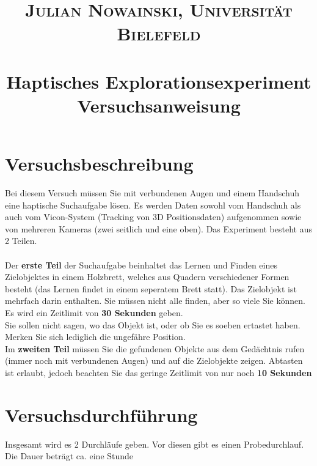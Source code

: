 \documentclass[paper=a4, fontsize=11pt]{scrartcl} %
\title{	
\normalfont \normalsize 
\textsc{Julian Nowainski, Universität Bielefeld} \\ [5pt] %
\horrule{0.5pt} \\[0.4cm] %
\huge Haptisches Explorationsexperiment \\ %
\large Versuchsanweisung
\horrule{2pt} \\[0.5cm] %
\date{\vspace{-10ex}} %
}
\numberwithin{equation}{section} %
\numberwithin{figure}{section} %
\numberwithin{table}{section} %
\begin{document}
\maketitle %


\section{Versuchsbeschreibung}
Bei diesem Versuch müssen Sie mit verbundenen Augen und einem Handschuh eine haptische Suchaufgabe lösen. Es werden Daten sowohl vom Handschuh als auch vom Vicon-System (Tracking von 3D Positionsdaten) aufgenommen sowie von mehreren Kameras (zwei seitlich und eine oben). Das Experiment besteht aus 2 Teilen. \\\\
Der \textbf{erste Teil} der Suchaufgabe beinhaltet das Lernen und Finden eines Zielobjektes in einem Holzbrett, welches aus Quadern verschiedener Formen besteht (das Lernen findet in einem seperatem Brett statt). Das Zielobjekt ist mehrfach darin enthalten. Sie müssen nicht alle finden, aber so viele Sie können. Es wird ein Zeitlimit von \textbf{30 Sekunden} geben. \\
Sie sollen nicht sagen, wo das Objekt ist, oder ob Sie es soeben ertastet haben. Merken Sie sich lediglich die ungefähre Position.\\
Im \textbf{zweiten Teil} müssen Sie die gefundenen Objekte aus dem Gedächtnis rufen (immer noch mit verbundenen Augen) und auf die Zielobjekte zeigen. Abtasten ist erlaubt, jedoch beachten Sie das geringe Zeitlimit von nur noch \textbf{10 Sekunden}



\section{Versuchsdurchführung}
Insgesamt wird es 2 Durchläufe geben. Vor diesen gibt es einen Probedurchlauf. Die Dauer beträgt ca. eine Stunde
\end{document}
